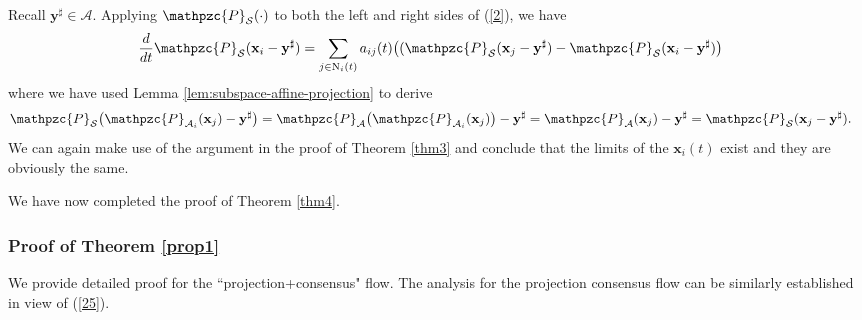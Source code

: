 \documentclass[a4paper, 11pt]{article}
\begin{document}
\medskip






Recall  $\mathbf{y}^\sharp \in \mathcal{A}$. Applying $\mathpzc{P}_{\mathcal{S}}(\cdot)$ to both the left and right sides of (\ref{2}), we have
\begin{align}\label{25}
&\frac{d}{dt} \mathpzc{P}_{\mathcal{S}}({\mathbf{x}}_i-\mathbf{y}^\sharp)=  \sum_{j\in \mathrm{N}_i(t)}a_{ij}(t)\big((\mathpzc{P}_{\mathcal{S}}({\mathbf{x}}_j-\mathbf{y}^\sharp)-\mathpzc{P}_{\mathcal{S}}({\mathbf{x}}_i-\mathbf{y}^\sharp)\big)
\end{align}
where we have used Lemma \ref{lem:subspace-affine-projection} to derive
\begin{align}
\mathpzc{P}_{\mathcal{S}}\big(\mathpzc{P}_{\mathcal{A}_i}({\mathbf{x}}_j)-\mathbf{y}^\sharp\big)&= \mathpzc{P}_{\mathcal{A}}\big(\mathpzc{P}_{\mathcal{A}_i}({\mathbf{x}}_j)\big)-\mathbf{y}^\sharp= \mathpzc{P}_{\mathcal{A}}({\mathbf{x}}_j)-\mathbf{y}^\sharp=\mathpzc{P}_{\mathcal{S}}({\mathbf{x}}_j-\mathbf{y}^\sharp).
\end{align} We can again make use of the argument  in the proof of Theorem \ref{thm3} and conclude that the limits of the ${\mathbf{x}}_i(t)$ exist and they are obviously the same.

We have now completed the proof of Theorem \ref{thm4}.

\subsubsection{Proof of Theorem \ref{prop1}}

We provide detailed proof for the ``projection+consensus" flow.  The analysis for the projection consensus flow can be similarly established in view of  (\ref{25}).
\end{document}
